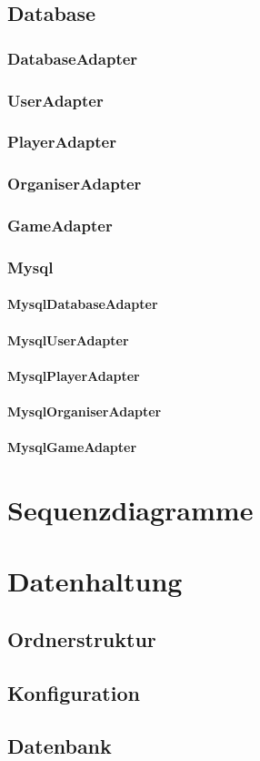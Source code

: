 \documentclass[a4paper]{scrreprt}
\begin{document}
    \section{Database}
    \subsection{DatabaseAdapter}
    \subsection{UserAdapter}
    \subsection{PlayerAdapter}
    \subsection{OrganiserAdapter}
    \subsection{GameAdapter}
    \subsection{Mysql}
    \subsubsection{MysqlDatabaseAdapter}
    \subsubsection{MysqlUserAdapter}
    \subsubsection{MysqlPlayerAdapter}
    \subsubsection{MysqlOrganiserAdapter}
    \subsubsection{MysqlGameAdapter}

   \chapter{Sequenzdiagramme}

    \chapter{Datenhaltung}
        \section{Ordnerstruktur}
        \section{Konfiguration}
        \section{Datenbank}
\end{document}
